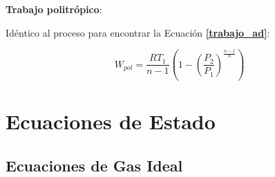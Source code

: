     \textbf{Trabajo politrópico}:
    
    Idéntico al proceso para encontrar la Ecuación \textbf{\ref{trabajo_ad}}:
    
    \begin{equation}
        W_{pol}=\frac{RT_{1}}{n - 1}\left ( 1 - \left ( \frac{P_{2}}{P_{1}}\right )^{\frac{n-1}{n}} \right )
    \end{equation}

\section{Ecuaciones de Estado}

    \subsection{Ecuaciones de Gas Ideal}
    
